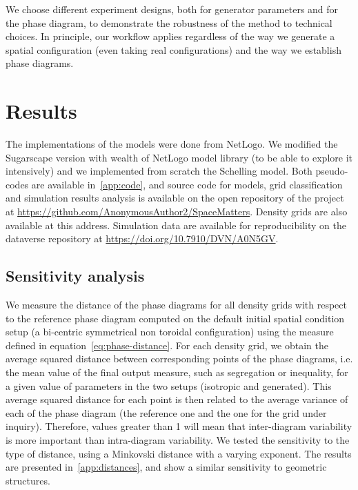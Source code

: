 \documentclass{JASSS}
\begin{document}
We choose different experiment designs, both for generator parameters and for the phase diagram, to demonstrate the robustness of the method to technical choices. In principle, our workflow applies regardless of the way we generate a spatial configuration (even taking real configurations) and the way we establish phase diagrams.




\section{Results}


The implementations of the models were done from NetLogo. We modified the Sugarscape version with wealth of NetLogo model library (to be able to explore it intensively) and we implemented from scratch the Schelling model. Both pseudo-codes are available in~\ref{app:code}, and source code for models, grid classification and simulation results analysis is available on the open repository of the project at \url{https://github.com/AnonymousAuthor2/SpaceMatters}. Density grids are also available at this address. Simulation data are available for reproducibility on the dataverse repository at \url{https://doi.org/10.7910/DVN/A0N5GV}.


\subsection{Sensitivity analysis}

We measure the distance of the phase diagrams for all density grids with respect to the reference phase diagram computed on the default initial spatial condition setup (a bi-centric symmetrical non toroidal configuration) using the measure defined in equation~\ref{eq:phase-distance}. For each density grid, we obtain the average squared distance between corresponding points of the phase diagrams, i.e. the mean value of the final output measure, such as segregation or inequality, for a given value of parameters in the two setups (isotropic and generated). This average squared distance for each point is then related to the average variance of each of the phase diagram (the reference one and the one for the grid under inquiry). Therefore, values greater than 1 will mean that inter-diagram variability is more important than intra-diagram variability. We tested the sensitivity to the type of distance, using a Minkovski distance with a varying exponent. The results are presented in~\ref{app:distances}, and show a similar sensitivity to geometric structures.
\end{document}
